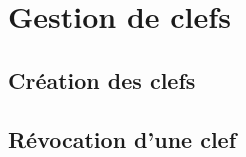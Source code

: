 
\section{Gestion de clefs}
\subsection{Création des clefs}
  
\subsection{Révocation d'une clef}
  
